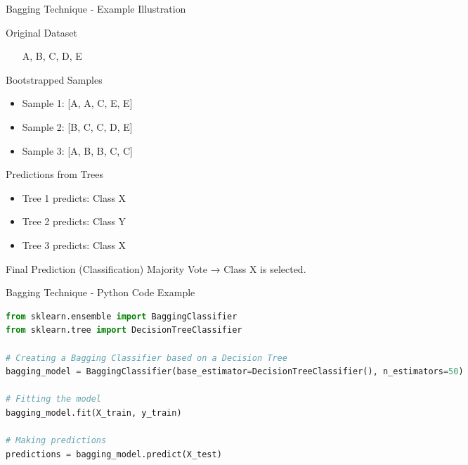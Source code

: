 \documentclass[aspectratio=169]{beamer}
\begin{document}
\begin{frame}[fragile]{Bagging Technique - Example Illustration}
    \begin{block}{Original Dataset}
        \begin{itemize}
            \item [A, B, C, D, E]
        \end{itemize}
    \end{block}

    \begin{block}{Bootstrapped Samples}
        \begin{itemize}
            \item Sample 1: [A, A, C, E, E]
            \item Sample 2: [B, C, C, D, E]
            \item Sample 3: [A, B, B, C, C]
        \end{itemize}
    \end{block}

    \begin{block}{Predictions from Trees}
        \begin{itemize}
            \item Tree 1 predicts: Class X
            \item Tree 2 predicts: Class Y
            \item Tree 3 predicts: Class X
        \end{itemize}
    \end{block}

    \begin{block}{Final Prediction (Classification)}
        Majority Vote → Class X is selected.
    \end{block}
\end{frame}

\begin{frame}[fragile]{Bagging Technique - Python Code Example}
    \begin{lstlisting}[language=python]
from sklearn.ensemble import BaggingClassifier
from sklearn.tree import DecisionTreeClassifier

# Creating a Bagging Classifier based on a Decision Tree
bagging_model = BaggingClassifier(base_estimator=DecisionTreeClassifier(), n_estimators=50)

# Fitting the model
bagging_model.fit(X_train, y_train)

# Making predictions
predictions = bagging_model.predict(X_test)
    \end{lstlisting}
\end{frame}
\end{document}
